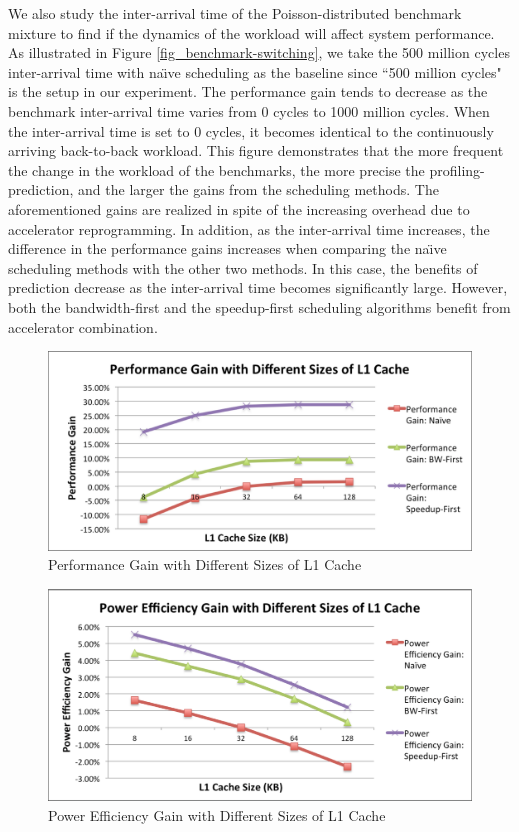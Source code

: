 We also study the inter-arrival time of the Poisson-distributed benchmark mixture to find if the dynamics of the workload will affect 
system performance. As illustrated in Figure \ref{fig_benchmark-switching}, we take the 500 million cycles inter-arrival time with na\"{\i}ve
 scheduling as the baseline since ``500 million cycles" is the setup in our experiment. The performance gain tends to decrease as 
the benchmark inter-arrival time varies from 0 cycles to 1000 million cycles. When the inter-arrival time is set to 0 cycles, it becomes
 identical to the continuously arriving back-to-back workload. This figure demonstrates that the more frequent the change in the workload of 
the benchmarks, the more precise the profiling-prediction, and the larger the gains from the scheduling methods. The aforementioned gains
are realized in spite of the increasing overhead due to accelerator reprogramming. In addition, as the inter-arrival time increases, 
the difference in the performance gains increases when comparing the na\"{\i}ve scheduling methods with the other two methods. 
In this case, the benefits of prediction decrease as the inter-arrival time becomes significantly large. However, both the bandwidth-first and
 the speedup-first scheduling algorithms benefit from accelerator combination. 

\begin{figure}
    \centering
    \includegraphics[width=4.5in]{L1-Cache-Performance}
    \caption{Performance Gain with Different Sizes of L1 Cache}
    \label{fig_l1_perf}
\end{figure}

\begin{figure}
    \centering
    \includegraphics[width=4.5in]{L1-Cache-Power}
    \caption{Power Efficiency Gain with Different Sizes of L1 Cache}
    \label{fig_l1_power}
\end{figure}

